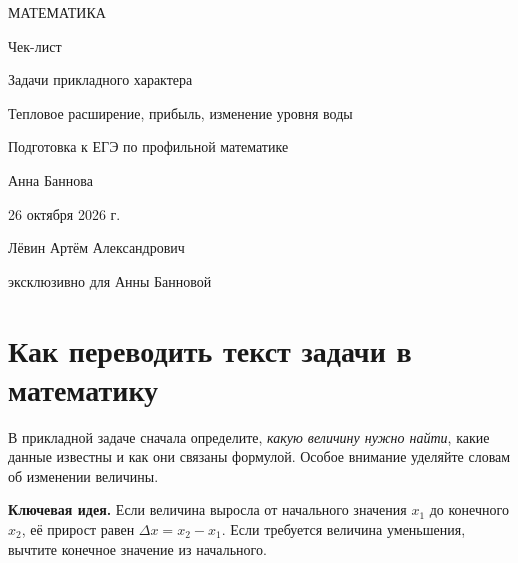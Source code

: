 \documentclass[a4paper,12pt]{article}
\newcommand{\idea}[1]{\par\textcolor{darkaccent}{\textbf{Ключевая идея.}} #1\par}
\begin{document}
\thispagestyle{empty}
\begin{center}
\vspace*{0.09\textheight}
{\large\color{darkaccent} МАТЕМАТИКА}\par
\vspace{1.10cm}
{\Huge Чек-лист}\par
\vspace{0.90cm}
{\LARGE\color{accent} Задачи прикладного характера}\par
\vspace{0.36cm}
{\large Тепловое расширение, прибыль, изменение уровня воды}\par
\vspace{1.00cm}
{\large Подготовка к ЕГЭ по профильной математике}\par
\vfill
{\large Анна Баннова}\par
\vspace{0.55cm}
{\large 26 октября 2026 г.}\par
\vspace{0.95cm}
{\normalsize Лёвин Артём Александрович}\par
{\small эксклюзивно для Анны Банновой}\par
\vspace{1.05cm}
\end{center}
\clearpage

\section{Как переводить текст задачи в математику}
В прикладной задаче сначала определите, \emph{какую величину нужно найти}, какие данные известны и как они связаны формулой. Особое внимание уделяйте словам об изменении величины.

\idea{Если величина выросла от начального значения $x_1$ до конечного $x_2$, её прирост равен $\Delta x=x_2-x_1$. Если требуется величина уменьшения, вычтите конечное значение из начального.}

\begin{center}
\end{center}
\end{document}
